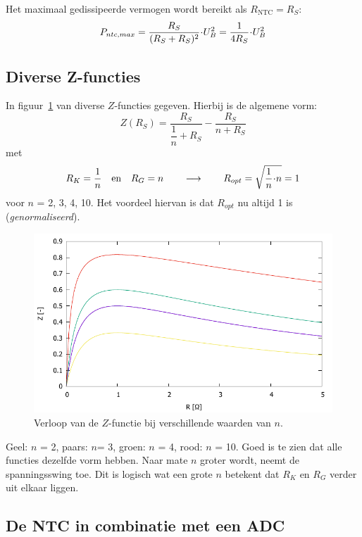 \documentclass[12pt,a4paper,final,twoside,fleqn]{article}
\newcommand{\rntc}{R_\text{NTC}}
\newcommand{\ropt}{R_{opt}}
\let\oldcdot\cdot
\renewcommand{\cdot}{\kern-.10em\oldcdot\kern-.10em}
\begin{document}
Het maximaal gedissipeerde vermogen wordt bereikt als $\rntc = R_S$:
\begin{equation}
P_{ntc,max} = \dfrac{R_S}{(R_S+R_S)^2}\cdot U_B^2 = \dfrac{1}{4R_S}\cdot U_B^2
\end{equation}


\subsection{Diverse Z-functies}
In figuur~\ref{fig:spanningsswings} van diverse $Z$-functies gegeven. Hierbij is
de algemene vorm:
\begin{equation}
Z(R_S) = \dfrac{R_S}{\dfrac{1}{n}+R_S} - \dfrac{R_S}{n+R_S}
\end{equation}
met
\begin{equation}
R_K = \dfrac{1}{n}\quad\text{en}\quad R_G = n \qquad\longrightarrow\qquad
\ropt = \sqrt{\dfrac{1}{n}\cdot n} = 1
\end{equation}
voor $n$ = 2, 3, 4, 10. Het voordeel hiervan is dat $\ropt$ nu altijd 1 is
(\textsl{genormaliseerd}).

\begin{figure}[ht!]
\centering
\includegraphics[scale=1]{gnuplot/spanningsswings}
\caption{Verloop van de $Z$-functie bij verschillende waarden van $n$.}
\label{fig:spanningsswings}
\end{figure}
 
Geel: $n$ = 2, paars: $n $= 3, groen: $n$ = 4, rood: $n$ = 10. Goed is te zien
dat alle functies dezelfde vorm hebben. Naar mate $n$ groter wordt, neemt de
spanningsswing toe. Dit is logisch wat een grote $n$ betekent dat $R_K$ en $R_G$
verder uit elkaar liggen.


\subsection{De NTC in combinatie met een ADC}
\end{document}
